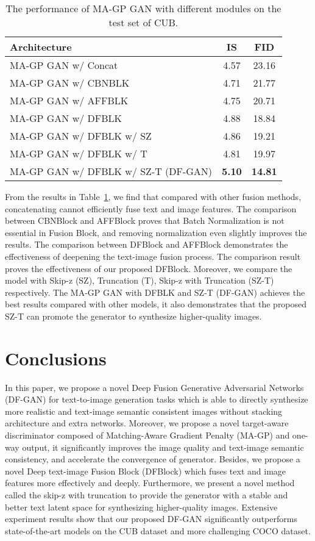 \documentclass[10pt,twocolumn,letterpaper]{article}
\begin{document}
\begin{table}[t] \small
\centering
\caption{The performance of MA-GP GAN with different modules on the test set of CUB.}
\begin{tabular}{l|c|c}\toprule
Architecture                 &IS    &FID  \\\midrule
MA-GP GAN w/ Concat           & 4.57           & 23.16\\ 
MA-GP GAN w/ CBNBLK           & 4.71           & 21.77\\
MA-GP GAN w/ AFFBLK           & 4.75           & 20.71\\
MA-GP GAN w/ DFBLK            & 4.88           & 18.84\\
MA-GP GAN w/ DFBLK w/ SZ       & 4.86           & 19.21\\
MA-GP GAN w/ DFBLK w/ T        & 4.81           & 19.97 \\
MA-GP GAN w/ DFBLK w/ SZ-T (DF-GAN)      & \textbf{5.10}  & \textbf{14.81} \\ \bottomrule
\end{tabular}
\label{table4}
\vspace{-0.4cm}
\end{table}

From the results in Table~\ref{table4}, we find that compared with other fusion methods, concatenating cannot efficiently fuse text and image features.
The comparison between CBNBlock and AFFBlock proves that Batch Normalization is not essential in Fusion Block, and removing normalization even slightly improves the results. 
The comparison between DFBlock and AFFBlock demonstrates the effectiveness of deepening the text-image fusion process. 
The comparison result proves the effectiveness of our proposed DFBlock. 
Moreover, we compare the model with Skip-z (SZ), Truncation (T), Skip-z with Truncation (SZ-T) respectively.
The MA-GP GAN with DFBLK and SZ-T (DF-GAN) achieves the best results compared with other models, it also demonstrates that the proposed SZ-T can promote the generator to synthesize higher-quality images.


\section{Conclusions}
In this paper, we propose a novel Deep Fusion Generative Adversarial Networks (DF-GAN) for text-to-image generation tasks which is able to directly synthesize more realistic and text-image semantic consistent images without stacking architecture and extra networks.
Moreover, we propose a novel target-aware discriminator composed of Matching-Aware Gradient Penalty (MA-GP) and one-way output, it significantly improves the image quality and text-image semantic consistency, and accelerate the convergence of generator.
Besides, we propose a novel Deep text-image Fusion Block (DFBlock) which fuses text and image features more effectively and deeply.
Furthermore, we present a novel method called the skip-z with truncation to provide the generator with a stable and better text latent space for synthesizing higher-quality images.
Extensive experiment results show that our proposed DF-GAN significantly outperforms state-of-the-art models on the CUB dataset and more challenging COCO dataset. 


\clearpage
{\small


}
\end{document}
